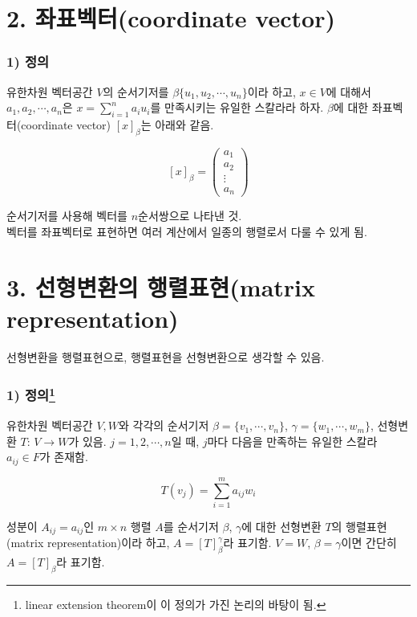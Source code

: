 \section*{2. 좌표벡터(coordinate vector)}

\subsubsection*{1) 정의\\}
\begin{DEF}
유한차원 벡터공간 $V$의 순서기저를 $\beta \{u_1,u_2, \cdots ,u_n\}$이라 하고, $x \in V$에 대해서 $a_1,a_2, \cdots ,a_n$은 $x = \sum_{i=1}^{n}{a_{i}u_{i}}$를 만족시키는 유일한 스칼라라 하자. $\beta$에 대한 좌표벡터(coordinate vector) $[x]_{\beta}$는 아래와 같음.

\[
[x]_{\beta} = 
\begin{pmatrix}
a_{1} \\
a_{2} \\
\vdots \\
a_{n}
\end{pmatrix}
\]
\end{DEF}

순서기저를 사용해 벡터를 $n$순서쌍으로 나타낸 것.\\
벡터를 좌표벡터로 표현하면 여러 계산에서 일종의 행렬로서 다룰 수 있게 됨.\\

\newpage


\section*{3. 선형변환의 행렬표현(matrix representation)}

선형변환을 행렬표현으로, 행렬표현을 선형변환으로 생각할 수 있음.

\subsubsection*{1) 정의\footnote{linear extension theorem이 이 정의가 가진 논리의 바탕이 됨.}\\}
\begin{DEF}
유한차원 벡터공간 $V,W$와 각각의 순서기저 $\beta = \{v_1, \cdots ,v_n\}$, $\gamma = \{w_1, \cdots ,w_m\}$, 선형변환 $T:\,V \rightarrow W$가 있음. $j=1,2, \cdots ,n$일 때, $j$마다 다음을 만족하는 유일한 스칼라 $a_{ij} \in F$가 존재함.

\[
T(v_{j})=\sum_{i=1}^{m}{a_{ij}w_i}
\]

성분이 $A_{ij}=a_{ij}$인 $m \times n$ 행렬 $A$를 순서기저 $\beta$, $\gamma$에 대한 선형변환 $T$의 행렬표현(matrix representation)이라 하고, $A=[T]_{\beta}^{\gamma}$라 표기함. $V=W$, $\beta=\gamma$이면 간단히 $A=[T]_{\beta}$라 표기함.
\end{DEF}

